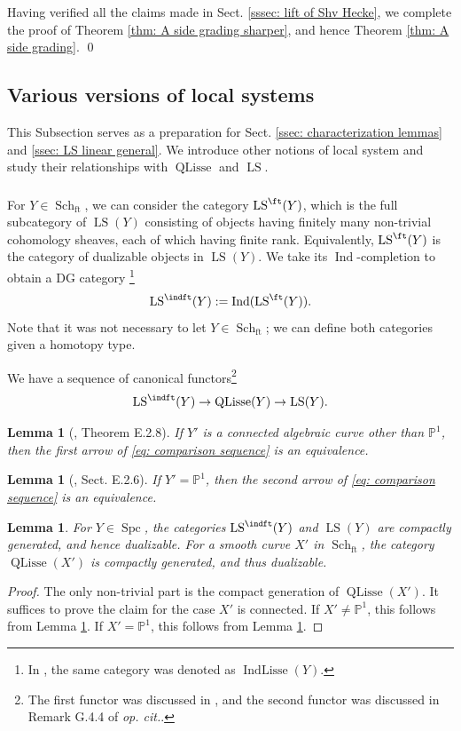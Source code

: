 \documentclass[10pt]{amsart}
\newcommand{\sssec}{\subsubsection}
\newtheorem{lemma}[subsubsection]{Lemma}
\theoremstyle{remark}
\newcommand{\pjl}{\mathbb{P}^1}
\newcommand{\on}{\operatorname}
\newcommand{\LS}{\on{LS}}
\newcommand{\QLisse}{\on{QLisse}}
\newcommand{\Schft}{\on{Sch}_{\on{ft}}}
\newcommand{\Spc}{\on{Spc}}
\DeclareMathOperator{\Ind}{Ind}
\begin{document}
Having verified all the claims made in Sect. \ref{sssec: lift of Shv Hecke}, we complete the proof of Theorem \ref{thm: A side grading sharper}, and hence Theorem \ref{thm: A side grading}. \qed


\subsection{Various versions of local systems}\label{ssec: various versions of local systems}
This Subsection serves as a preparation for Sect. \ref{ssec: characterization lemmas} and \ref{ssec: LS linear general}. We introduce other notions of local system and study their relationships with $\QLisse$ and $\LS$. 

\sssec{}
For $Y\in\Schft$, we can consider the category $\LS^{\ft}(Y)$, which is the full subcategory of $\LS(Y)$ consisting of objects having finitely many non-trivial cohomology sheaves, each of which having finite rank. Equivalently, $\LS^{\ft}(Y)$ is the category of dualizable objects in $\LS(Y)$. We take its $\Ind$-completion to obtain a DG category \footnote{In \cite[Sect. 1.3]{AGKRRV}, the same category was denoted as $\on{IndLisse}(Y)$.}
\[\LS^{\indft}(Y):=\Ind(\LS^{\ft}(Y)).\]
Note that it was not necessary to let $Y\in\Schft$; we can define both categories given a homotopy type.
\medskip

We have a sequence of canonical functors\footnote{The first functor was discussed in \cite[Sect. 1.3.2]{AGKRRV}, and the second functor was discussed in Remark G.4.4 of \emph{op. cit.}.}
\begin{equation}\label{eq: comparison sequence}
    \LS^{\indft}(Y)\rightarrow \QLisse(Y)\rightarrow \LS(Y).
\end{equation}

\begin{lemma}[\cite{AGKRRV}, Theorem E.2.8]\label{lem: indft vs QLisse}
    If $Y'$ is a connected algebraic curve other than $\pjl$, then the first arrow of \eqref{eq: comparison sequence} is an equivalence.
\end{lemma}
\begin{lemma}[\cite{AGKRRV}, Sect. E.2.6]\label{lem: QLisse vs LS}
    If $Y'=\pjl$, then the second arrow of \eqref{eq: comparison sequence} is an equivalence.
\end{lemma}


\begin{lemma}\label{lem: dualizability}
    For $Y\in\Spc$, the categories $\LS^{\indft}(Y)$ and $\LS(Y)$ are compactly generated, and hence dualizable.
    For a smooth curve $X'$ in $\Schft$, the category $\QLisse(X')$ is compactly generated, and thus dualizable.
\end{lemma}
\begin{proof}
    The only non-trivial part is the compact generation of $\QLisse(X')$.
    It suffices to prove the claim for the case $X'$ is connected. If $X'\ne\pjl$, this follows from Lemma \ref{lem: indft vs QLisse}. If $X'=\pjl$, this follows from Lemma \ref{lem: QLisse vs LS}.
\end{proof}
\end{document}
